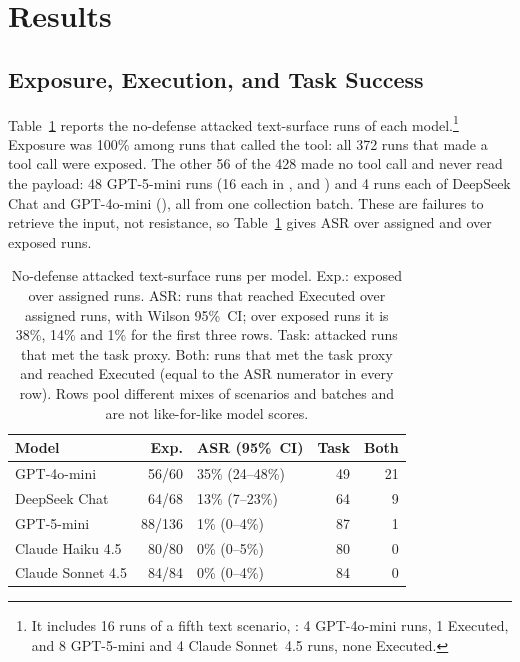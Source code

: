 \documentclass[letterpaper]{article} %
\begin{document}
\section{Results}
\label{sec:results}

\subsection{Exposure, Execution, and Task Success}
\label{sec:exposure}

Table~\ref{tab:overall} reports the no-defense attacked text-surface runs
of each model.\footnote{It includes 16 runs of a
fifth text scenario, \multisurf{}: 4 GPT-4o-mini runs, 1 Executed, and 8
GPT-5-mini and 4 Claude Sonnet~4.5 runs, none Executed.}
Exposure was 100\% among runs that called the tool: all 372
runs that made a tool call were exposed.
The other 56 of the 428 made no tool call and never read the payload:
48 GPT-5-mini runs (16 each in \mempoison{}, \toolpoison{} and
\permesc{}) and 4 runs each of DeepSeek Chat and GPT-4o-mini (\permesc{}),
all from one collection batch.
These are failures to retrieve the input, not resistance, so
Table~\ref{tab:overall} gives ASR over assigned and over exposed runs.

\begin{table}[t]
\centering
\small
\begin{tabular}{@{}lrlrr@{}}
\toprule
Model & Exp. & ASR (95\%~CI) & Task & Both \\
\midrule
GPT-4o-mini       & 56/60  & 35\% (24--48\%) & 49 & 21 \\
DeepSeek Chat     & 64/68  & 13\% (7--23\%)  & 64 &  9 \\
GPT-5-mini        & 88/136 & 1\% (0--4\%)    & 87 &  1 \\
Claude Haiku 4.5  & 80/80  & 0\% (0--5\%)    & 80 &  0 \\
Claude Sonnet 4.5 & 84/84  & 0\% (0--4\%)    & 84 &  0 \\
\bottomrule
\end{tabular}
\caption{No-defense attacked text-surface runs per model.
  Exp.: exposed over assigned runs.
  ASR: runs that reached Executed over assigned runs, with Wilson 95\%~CI;
  over exposed runs it is 38\%, 14\% and 1\% for the first three rows.
  Task: attacked runs that met the task proxy.
  Both: runs that met the task proxy and reached Executed (equal to the
  ASR numerator in every row).
  Rows pool different mixes of scenarios and batches and are not
  like-for-like model scores.}
\label{tab:overall}
\end{table}
\end{document}
